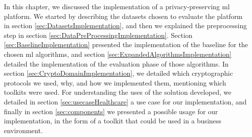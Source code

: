 In this chapter, we discussed the implementation of a privacy-preserving \ac{ml} platform. We started by describing the datasets chosen to evaluate the platform in section \ref{sec:DatasetsImplementation}, and then we explained the preprocessing step in section \ref{sec:DataPreProcessingImplementation}.
Section \ref{sec:BaselineImplementation} presented the implementation of the baseline for the chosen \ac{ml} algorithms, and section \ref{sec:ExpandedAlgorithmsImplementation} detailed the implementation of the evaluation phase of those algorithms.
In section \ref{sec:CryptoDomainImplementation}, we detailed which cryptographic protocols we used, why, and how we implemented them, mentioning which toolkits were used.
For understanding the uses of the solution developed, we detailed in section \ref{sec:usecaseHealthcare} a use case for our implementation, and finally in section \ref{sec:components} we presented a possible usage for our implementation, in the form of a toolkit that could be used in a business environment.


